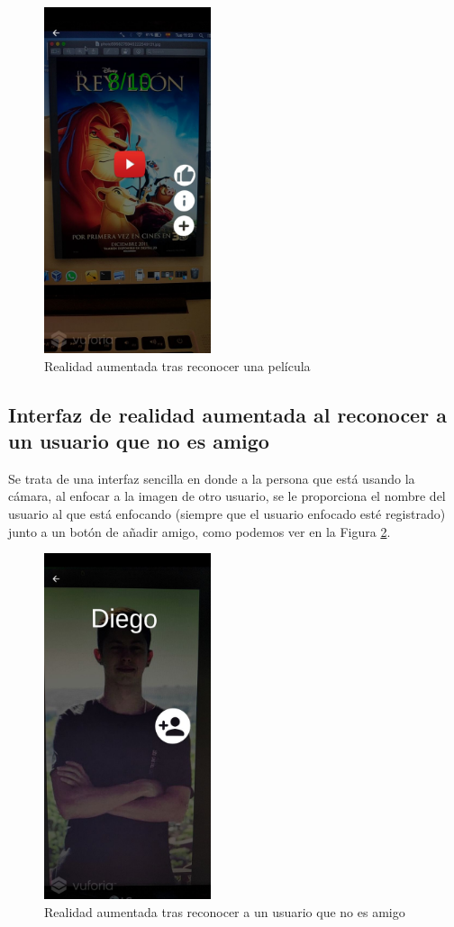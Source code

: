 \begin{figure}[H]
    \centering
    \includegraphics[height=4in]{figures/filmrecognized2.jpg}
    \caption{Realidad aumentada tras reconocer una película}
    \label{fig:ra_pelicula}
\end{figure}

\subsection{Interfaz de realidad aumentada al reconocer a un usuario que no es amigo}
\label{makereference3.4.5.1}
Se trata de una interfaz sencilla en donde a la persona que está usando la cámara, al enfocar a la imagen de otro usuario, se le proporciona el nombre del usuario al
 que está enfocando (siempre que el usuario enfocado esté registrado) junto a un botón de añadir amigo, como podemos ver en la Figura \ref{fig:ra_usuario}.
\begin{figure}[H]
    \centering
    \includegraphics[height=4in]{figures/usernotFriendrecognized.jpg}
    \caption{Realidad aumentada tras reconocer a un usuario que no es amigo}
    \label{fig:ra_usuario}
\end{figure}
